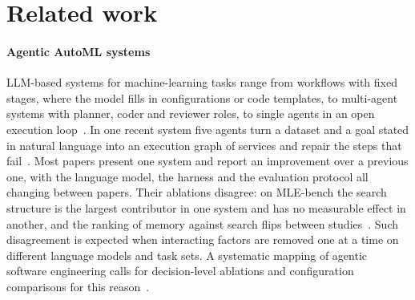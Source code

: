 \section{Related work}
\label{sec:related}




\paragraph{Agentic AutoML systems} LLM-based systems for machine-learning
tasks range from workflows with fixed stages, where the model fills in
configurations or code templates, to multi-agent systems with planner,
coder and reviewer roles, to single agents in an open execution
loop~\citep{trirat2025automlagent,li2024autokaggle,guo2024dsagent,yang2025rdagent,kulibaba2025kompeteai,fang2025mlzero,lapin2025lightautods}.
In one recent system five agents turn a dataset and a goal stated in natural
language into an execution graph of services and repair the steps that
fail~\citep{bara2026thinkit}. Most
papers present one system and report an improvement over a previous one,
with the language model, the harness and the evaluation protocol all changing
between papers. Their ablations disagree: on MLE-bench the search structure
is the largest contributor in one system and has no measurable effect in
another, and the ranking of memory against search flips between
studies~\citep{toledo2025aira}. Such disagreement is expected when
interacting factors are removed one at a time on different language models
and task sets. A systematic mapping of agentic software engineering calls
for decision-level ablations and configuration comparisons for this
reason~\citep{diazvillegas2026mapping}.

